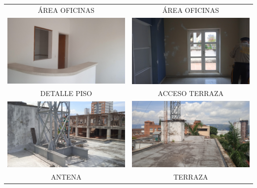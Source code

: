 \documentclass[12pt,a4paper,twoside]{article}
\begin{document}
{\begin{tabular}{ c c }
ÁREA OFICINAS & ÁREA OFICINAS\\
	\includegraphics[width = 7 cm]{Imagenes/31} & \includegraphics[width = 7 cm]{Imagenes/32} \\
DETALLE PISO & ACCESO TERRAZA\\
	\includegraphics[width = 7 cm]{Imagenes/33} & \includegraphics[width = 7 cm]{Imagenes/34} \\
ANTENA & TERRAZA\\
\end{tabular}

\begin{tabular}{ c c }
	

\end{tabular}}
\end{document}

